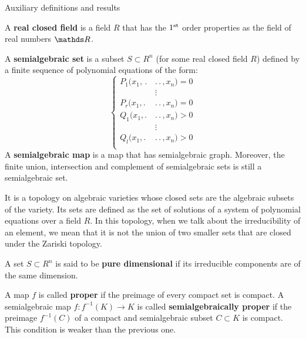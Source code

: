 \documentclass[11pt, a4paper, english, twoside, notitlepage]{report}
\begin{document}
\appendix
\begin{chapter}{Auxiliary definitions and results}

\begin{definition}\label{realCField}
	A \textbf{real closed field} is a field $R$ that has the $1\textsuperscript{st}$ order properties as the field of real numbers $\R$.
\end{definition}

\begin{definition}\label{semialgSet}
	A \textbf{semialgebraic set} is a subset $S \subset R^n$ (for some real closed field $R$) defined by a finite sequence of polynomial equations of the form:
	\begin{equation*}
	\left\{
	\begin{aligned}
		P_1(x_1,\, .\,&.\,.\, , x_n) = 0\\
		&\vdots\\
		P_r(x_1, .\,&.\,.\, , x_n) = 0 \\
		Q_1(x_1, .\,&.\,.\, , x_n) > 0 \\
		&\vdots\\
		Q_l(x_1, .\,&.\,.\, , x_n) > 0 \\
	\end{aligned}
	\right.
	\end{equation*}
	A \textbf{semialgebraic map} is a map that has semialgebraic graph. Moreover, the finite union, intersection and complement of semialgebraic sets is still a semialgebraic set.
\end{definition}

\begin{definition}\label{zariski}
	It is a topology on algebraic varieties whose closed sets are the algebraic subsets of the variety. Its sets are defined as the set of solutions of a system of polynomial equations over a field $R$. In this topology, when we talk about the irreducibility of an element, we mean that it is not the union of two smaller sets that are closed under the Zariski topology.
\end{definition}

\begin{definition}\label{pureDim}
	A set $S \subset R^n$ is said to be \textbf{pure dimensional} if its irreducible components are of the same dimension.
\end{definition}

\begin{definition}\label{properMap}
	A map $f$ is called \textbf{proper} if the preimage of every compact set is compact. A semialgebraic map $f: f^{-1}(K) \longrightarrow K$ is called \textbf{semialgebraically proper} if the preimage $f^{-1}(C)$ of a compact and semialgebraic subset $C \subset K$ is compact. This condition is weaker than the previous one.
\end{definition}


\end{chapter}
\end{document}
